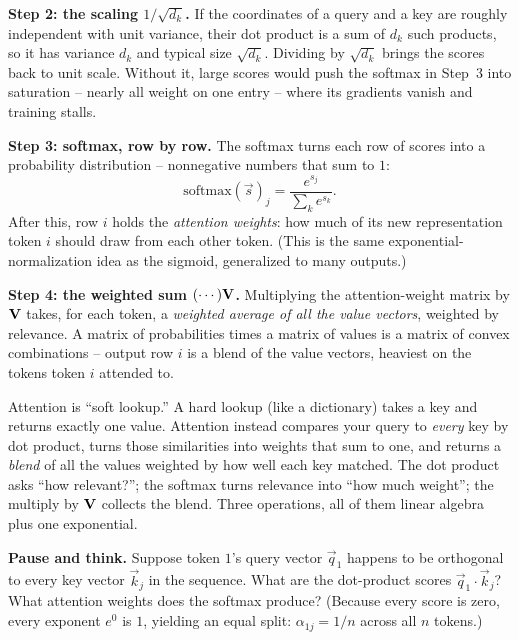 \textbf{Step 2: the scaling $1/\sqrt{d_k}$.} If the coordinates of a query and a key are
roughly independent with unit variance, their dot product is a sum of $d_k$ such
products, so it has variance $d_k$ and typical size $\sqrt{d_k}$. Dividing by
$\sqrt{d_k}$ brings the scores back to unit scale. Without it, large scores would push the
softmax in Step~3 into saturation -- nearly all weight on one entry -- where its gradients
vanish and training stalls.

\textbf{Step 3: softmax, row by row.} The softmax turns each row of scores into a
probability distribution -- nonnegative numbers that sum to $1$:
\[
\text{softmax}(\vec{s})_j = \frac{e^{s_j}}{\sum_k e^{s_k}}.
\]
After this, row $i$ holds the \emph{attention weights}: how much of its new representation
token $i$ should draw from each other token. (This is the same exponential-normalization
idea as the sigmoid, generalized to many outputs.)

\textbf{Step 4: the weighted sum $(\cdots)\mathbf{V}$.} Multiplying the attention-weight
matrix by $\mathbf{V}$ takes, for each token, a \emph{weighted average of all the value
vectors}, weighted by relevance. A matrix of probabilities times a matrix of values is a
matrix of convex combinations -- output row $i$ is a blend of the value vectors, heaviest
on the tokens token $i$ attended to.

\begin{intuitionbox}
Attention is ``soft lookup.'' A hard lookup (like a dictionary) takes a key and returns
exactly one value. Attention instead compares your query to \emph{every} key by dot
product, turns those similarities into weights that sum to one, and returns a
\emph{blend} of all the values weighted by how well each key matched. The dot product
asks ``how relevant?''; the softmax turns relevance into ``how much weight''; the
multiply by $\mathbf{V}$ collects the blend. Three operations, all of them linear algebra
plus one exponential.
\end{intuitionbox}

\begin{recoverybox}
\textbf{Pause and think.} Suppose token $1$'s query vector $\vec{q}_1$ happens to be
orthogonal to every key vector $\vec{k}_j$ in the sequence. What are the dot-product
scores $\vec{q}_1\cdot\vec{k}_j$? What attention weights does the softmax produce?
(Because every score is zero, every exponent $e^0$ is $1$, yielding an equal split:
$\alpha_{1j} = 1/n$ across all $n$ tokens.)
\end{recoverybox}

